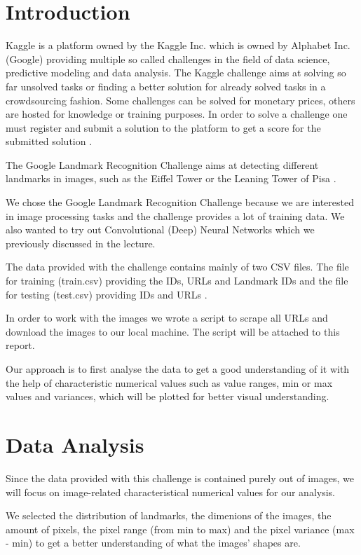 \chapter{Introduction}

Kaggle is a platform owned by the Kaggle Inc. which is owned by Alphabet Inc. (Google) providing multiple so called challenges in the field of data science, predictive modeling and data analysis. The Kaggle challenge aims at solving so far unsolved tasks or finding a better solution for already solved tasks in a crowdsourcing fashion. Some challenges can be solved for monetary prices, others are hosted for knowledge or training purposes. In order to solve a challenge one must register and submit a solution to the platform to get a score for the submitted solution \cite{kaggle}.

The Google Landmark Recognition Challenge aims at detecting different landmarks in images, such as the Eiffel Tower or the Leaning Tower of Pisa \cite{challenge}.

We chose the Google Landmark Recognition Challenge because we are interested in image processing tasks and the challenge provides a lot of training data. We also wanted to try out Convolutional (Deep) Neural Networks which we previously discussed in the lecture.

The data provided with the challenge contains mainly of two CSV files. The file for training (train.csv) providing the IDs, URLs and Landmark IDs and the file for testing (test.csv) providing IDs and URLs \cite{data}.

In order to work with the images we wrote a script to scrape all URLs and download the images to our local machine. The script will be attached to this report.

Our approach is to first analyse the data to get a good understanding of it with the help of characteristic numerical values such as value ranges, min or max values and variances, which will be plotted for better visual understanding.

\chapter{Data Analysis}

Since the data provided with this challenge is contained purely out of images, we will focus on image-related characteristical numerical values for our analysis.

We selected the distribution of landmarks, the dimenions of the images, the amount of pixels, the pixel range (from min to max) and the pixel variance (max - min) to get a better understanding of what the images' shapes are. 

